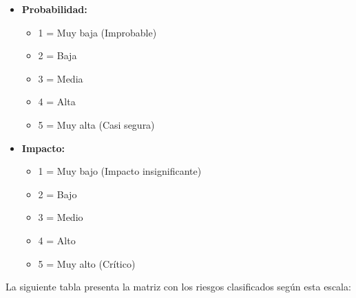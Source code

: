 \begin{itemize}
  \item \textbf{Probabilidad:}
    \begin{itemize}
      \item 1 = Muy baja (Improbable)
      \item 2 = Baja
      \item 3 = Media
      \item 4 = Alta
      \item 5 = Muy alta (Casi segura)
    \end{itemize}
  \item \textbf{Impacto:}
    \begin{itemize}
      \item 1 = Muy bajo (Impacto insignificante)
      \item 2 = Bajo
      \item 3 = Medio
      \item 4 = Alto
      \item 5 = Muy alto (Crítico)
    \end{itemize}
\end{itemize}

La siguiente tabla presenta la matriz con los riesgos clasificados según esta escala:

